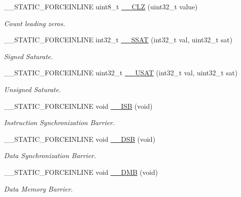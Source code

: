 \begin{DoxyCompactItemize}
\+\_\+\+\_\+\+S\+T\+A\+T\+I\+C\+\_\+\+F\+O\+R\+C\+E\+I\+N\+L\+I\+NE uint8\+\_\+t \mbox{\hyperlink{group___c_m_s_i_s___core___instruction_interface_gaf32ee2525f946bce31504904f3ef8243}{\+\_\+\+\_\+\+C\+LZ}} (uint32\+\_\+t value)
\begin{DoxyCompactList}\small\item\em Count leading zeros. \end{DoxyCompactList}\item 
\+\_\+\+\_\+\+S\+T\+A\+T\+I\+C\+\_\+\+F\+O\+R\+C\+E\+I\+N\+L\+I\+NE int32\+\_\+t \mbox{\hyperlink{group___c_m_s_i_s___core___instruction_interface_ga372c0535573dde3e37f0f08c774a3487}{\+\_\+\+\_\+\+S\+S\+AT}} (int32\+\_\+t val, uint32\+\_\+t sat)
\begin{DoxyCompactList}\small\item\em Signed Saturate. \end{DoxyCompactList}\item 
\+\_\+\+\_\+\+S\+T\+A\+T\+I\+C\+\_\+\+F\+O\+R\+C\+E\+I\+N\+L\+I\+NE uint32\+\_\+t \mbox{\hyperlink{group___c_m_s_i_s___core___instruction_interface_ga6562dbd8182d1571e22dbca7ebdfa9bc}{\+\_\+\+\_\+\+U\+S\+AT}} (int32\+\_\+t val, uint32\+\_\+t sat)
\begin{DoxyCompactList}\small\item\em Unsigned Saturate. \end{DoxyCompactList}\item 
\+\_\+\+\_\+\+S\+T\+A\+T\+I\+C\+\_\+\+F\+O\+R\+C\+E\+I\+N\+L\+I\+NE void \mbox{\hyperlink{group___c_m_s_i_s___core___instruction_interface_gae26c2b3961e702aeabc24d4984ebd369}{\+\_\+\+\_\+\+I\+SB}} (void)
\begin{DoxyCompactList}\small\item\em Instruction Synchronization Barrier. \end{DoxyCompactList}\item 
\+\_\+\+\_\+\+S\+T\+A\+T\+I\+C\+\_\+\+F\+O\+R\+C\+E\+I\+N\+L\+I\+NE void \mbox{\hyperlink{group___c_m_s_i_s___core___instruction_interface_ga7fe277f5385d23b9c44b2cbda1577ce9}{\+\_\+\+\_\+\+D\+SB}} (void)
\begin{DoxyCompactList}\small\item\em Data Synchronization Barrier. \end{DoxyCompactList}\item 
\+\_\+\+\_\+\+S\+T\+A\+T\+I\+C\+\_\+\+F\+O\+R\+C\+E\+I\+N\+L\+I\+NE void \mbox{\hyperlink{group___c_m_s_i_s___core___instruction_interface_gab1ea24daaaaee9c828f90cbca330cb5e}{\+\_\+\+\_\+\+D\+MB}} (void)
\begin{DoxyCompactList}\small\item\em Data Memory Barrier. \end{DoxyCompactList}\item 

\end{DoxyCompactItemize}
